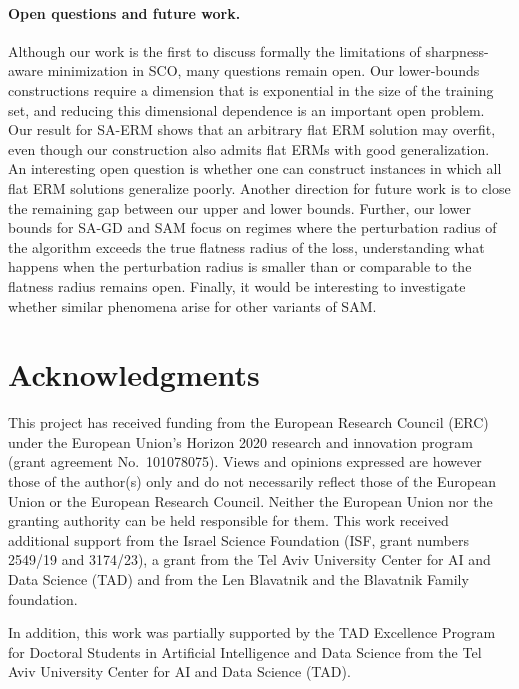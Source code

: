 \documentclass[11pt]{article}
\begin{document}
\paragraph{Open questions and future work.}
Although our work is the first to discuss formally the limitations of sharpness-aware minimization in SCO, many questions remain open. 
Our lower-bounds constructions require a dimension that is exponential in the size of the training set, and reducing this dimensional dependence is an important open problem. Our result for SA-ERM shows that an arbitrary flat ERM solution may overfit, even though our construction also admits flat ERMs with good generalization. An interesting open question is whether one can construct instances in which all flat ERM solutions generalize poorly. Another direction for future work is to close the remaining gap between our upper and lower bounds. Further, our lower bounds for SA-GD and SAM focus on regimes where the perturbation radius of the algorithm exceeds the true flatness radius of the loss, understanding what happens when the perturbation radius is smaller than or comparable to the flatness radius remains open. Finally, it would be interesting to investigate whether similar phenomena arise for other variants of SAM.



\section*{Acknowledgments}

This project has received funding from the European Research Council (ERC) under the European Union’s Horizon 2020 research and innovation program (grant agreement No.\ 101078075).
Views and opinions expressed are however those of the author(s) only and do not necessarily reflect those of the European Union or the European Research Council. Neither the European Union nor the granting authority can be held responsible for them.
This work received additional support from the Israel Science Foundation (ISF, grant numbers 2549/19 and 3174/23), a grant from the Tel Aviv University Center for AI and Data Science (TAD) and
from the Len Blavatnik and the Blavatnik Family foundation.

In addition, this work was partially supported by the TAD Excellence Program for Doctoral Students in Artificial Intelligence and Data Science from the Tel Aviv University Center for AI and Data Science (TAD).
\end{document}

